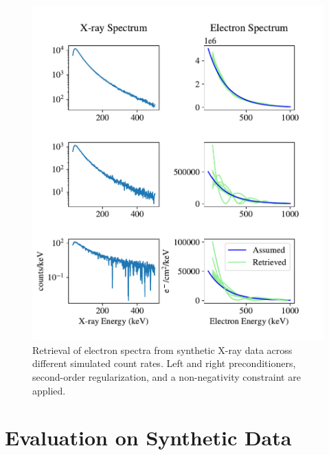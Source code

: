 \begin{figure}[p]
    \centering
    \includegraphics[width=\textwidth]{figures/chapter_4/why_non_negative_is_good/why_non_negative_is_good.pdf}
    \caption{Retrieval of electron spectra from synthetic X-ray data across different simulated count rates. Left and right
    preconditioners, second-order regularization, and a non-negativity constraint are applied.}
    \label{why_non_negative_is_good}
\end{figure}

\section{Evaluation on Synthetic Data}

